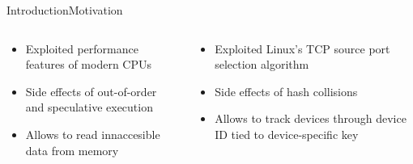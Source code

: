 \documentclass[aspectratio=169, hyperref={colorlinks=true, allcolors=SecondaryColor}, c]{beamer}
\begin{document}
\begin{frame}[fragile]{Introduction}{Motivation}
\begin{columns}
		\end{columns}
		\begin{columns}
			\begin{column}[t]{0.5\textwidth}
				\begin{itemize}
					\item \alert{Exploited} performance features of modern CPUs
					\item \alert{Side effects} of out-of-order and speculative execution
					\item \alert{Allows} to read innaccesible data from memory
				\end{itemize}
			\end{column}
			\begin{column}[t]{0.5\textwidth}
				\begin{itemize}
					\item \alert{Exploited} Linux’s TCP source port selection algorithm
					\item \alert{Side effects} of hash collisions
					\item \alert{Allows} to track devices through device ID tied to device-specific key
				\end{itemize}
			\end{column}
		\end{columns}
	\end{frame}
\end{document}
